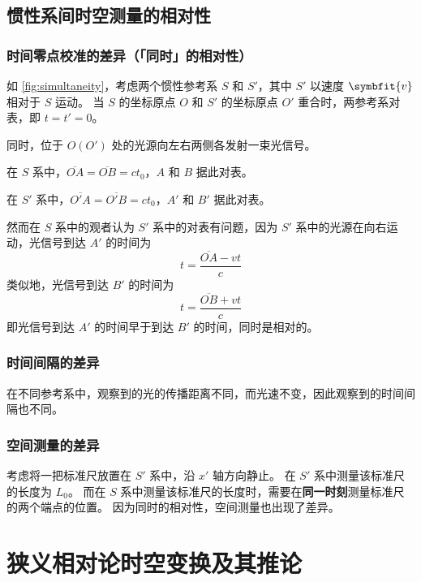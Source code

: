 \subsection{惯性系间时空测量的相对性}

\subsubsection{时间零点校准的差异（「同时」的相对性）}

如 \cref{fig:simultaneity}，考虑两个惯性参考系 $S$ 和 $S'$，其中 $S'$ 以速度 $\symbfit{v}$ 相对于 $S$ 运动。
当 $S$ 的坐标原点 $O$ 和 $S'$ 的坐标原点 $O'$ 重合时，两参考系对表，即 $t = t' = 0$。


同时，位于 $O(O')$ 处的光源向左右两侧各发射一束光信号。

在 $S$ 系中，$\overline{OA} = \overline{OB} = c t_0$，$A$ 和 $B$ 据此对表。

在 $S'$ 系中，$\overline{O'A} = \overline{O'B} = c t_0$，$A'$ 和 $B'$ 据此对表。

然而在 $S$ 系中的观者认为 $S'$ 系中的对表有问题，因为 $S'$ 系中的光源在向右运动，光信号到达 $A'$ 的时间为
\begin{equation}
    t = \frac{\overline{OA} - v t}{c}
\end{equation}
类似地，光信号到达 $B'$ 的时间为
\begin{equation}
    t = \frac{\overline{OB} + v t}{c}
\end{equation}
即光信号到达 $A'$ 的时间早于到达 $B'$ 的时间，同时是相对的。

\subsubsection{时间间隔的差异}

在不同参考系中，观察到的光的传播距离不同，而光速不变，因此观察到的时间间隔也不同。

\subsubsection{空间测量的差异}

考虑将一把标准尺放置在 $S'$ 系中，沿 $x'$ 轴方向静止。
在 $S'$ 系中测量该标准尺的长度为 $L_0$。
而在 $S$ 系中测量该标准尺的长度时，需要在\textbf{同一时刻}测量标准尺的两个端点的位置。
因为同时的相对性，空间测量也出现了差异。

\section{狭义相对论时空变换及其推论}

